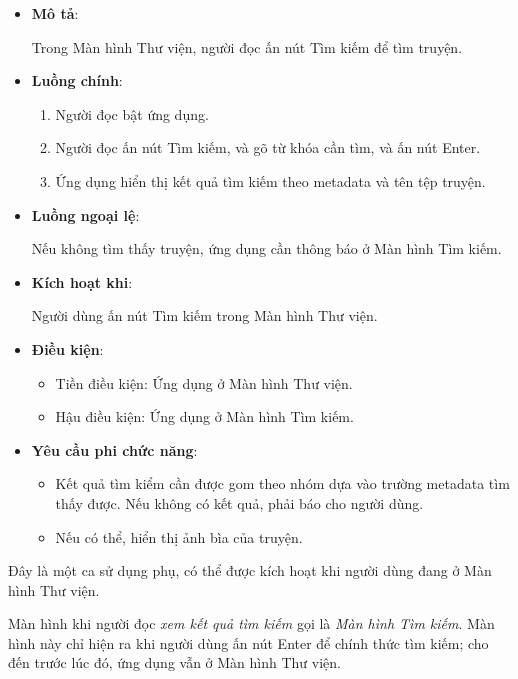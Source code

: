 \documentclass[
]{article}
\providecommand{\tightlist}{%
  \setlength{\itemsep}{0pt}\setlength{\parskip}{0pt}}
\begin{document}
\begin{itemize}
\item
  \textbf{Mô tả}:

  Trong Màn hình Thư viện, người đọc ấn nút Tìm kiếm để tìm truyện.
\item
  \textbf{Luồng chính}:

  \begin{enumerate}
  \def\labelenumi{\arabic{enumi}.}
  \tightlist
  \item
    Người đọc bật ứng dụng.
  \item
    Người đọc ấn nút Tìm kiếm, và gõ từ khóa cần tìm, và ấn nút Enter.
  \item
    Ứng dụng hiển thị kết quả tìm kiếm theo metadata và tên tệp truyện.
  \end{enumerate}
\item
  \textbf{Luồng ngoại lệ}:

  Nếu không tìm thấy truyện, ứng dụng cần thông báo ở Màn hình Tìm kiếm.
\item
  \textbf{Kích hoạt khi}:

  Người dùng ấn nút Tìm kiếm trong Màn hình Thư viện.
\item
  \textbf{Điều kiện}:

  \begin{itemize}
  \tightlist
  \item
    Tiền điều kiện: Ứng dụng ở Màn hình Thư viện.
  \item
    Hậu điều kiện: Ứng dụng ở Màn hình Tìm kiếm.
  \end{itemize}
\item
  \textbf{Yêu cầu phi chức năng}:

  \begin{itemize}
  \tightlist
  \item
    Kết quả tìm kiểm cần được gom theo nhóm dựa vào trường metadata tìm
    thấy được. Nếu không có kết quả, phải báo cho người dùng.
  \item
    Nếu có thể, hiển thị ảnh bìa của truyện.
  \end{itemize}
\end{itemize}

Đây là một ca sử dụng phụ, có thể được kích hoạt khi người dùng đang ở
Màn hình Thư viện.

Màn hình khi người đọc \emph{xem kết quả tìm kiếm} gọi là \emph{Màn hình
Tìm kiếm}. Màn hình này chỉ hiện ra khi người dùng ấn nút Enter để chính
thức tìm kiếm; cho đến trước lúc đó, ứng dụng vẫn ở Màn hình Thư viện.
\end{document}
